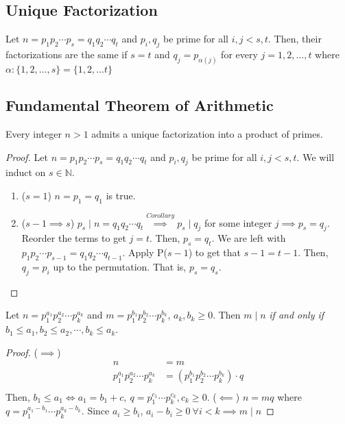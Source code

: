 \documentclass{report}
\newcommand{\N}{\mathbb{N}}
\newcommand{\proposition}[1]{\begin{tcolorbox}[title=\textit{Proposition}]{#1}\end{tcolorbox}}
\newcommand{\theorem}[1]{\begin{tcolorbox}[title=\textit{Theorem}]{#1}\end{tcolorbox}}
\begin{document}
\subsection{Unique Factorization}
Let $n = p_1 p_2 \cdots p_s = q_1 q_2 \cdots q_t$ and $p_i, q_j$ be prime for all $i, j < s, t$.
Then, their factorizations are the same if $s = t$ and $q_j = p_{\alpha(j)}$ for every 
$j = 1, 2, \ldots, t$ where $\alpha : \{1, 2, \ldots, s \} = \{ 1, 2, \ldots t \}$


\subsection{Fundamental Theorem of Arithmetic}
\theorem {
    Every integer $n > 1$ admits a unique factorization into a product of primes.
}
\begin{proof}
    Let $n = p_1 p_2 \cdots p_s = q_1 q_2 \cdots q_t$ and $p_i, q_j$ be prime for all $i, j < s, t$. We
    will induct on $s \in \N$.
    \begin{enumerate}[label=\textit{(\roman*)}]
        \item ($s = 1$)
            \newline
            $n = p_1 = q_1$ is true.
        \item ($s - 1 \implies s$)
            \newline
            $p_s \mid n = q_1 q_2 \cdots q_t \stackrel{\textit{Corollary}}{\implies} p_s \mid q_j$ 
            for some integer $j \implies p_s = q_j$. Reorder the terms to get $j = t$. Then, $p_s = q_t$. 
            We are left with $p_1 p_2 \cdots p_{s - 1} = q_1 q_2 \cdots q_{t - 1}$. Apply P($s - 1$) 
            to get that $s - 1 = t - 1$. Then, $q_j = p_i$ up to the permutation. That is, $p_s = q_s$.
    \end{enumerate}
\end{proof}


\proposition {
    Let $n = p_1^{a_1} p_2^{a_2} \cdots p_k^{a_k}$ and $m = p_1^{b_1} p_2^{b_2} \cdots p_k^{b_k}$, 
    $a_k, b_k \geq 0$.
    Then $m \mid n$ \textit{if and only if} $b_1 \leq a_1, b_2 \leq a_2, \cdots, b_k \leq a_k$.
}
\begin{proof}
    ($\implies$)
    \begin{align*}
        n &= m \\
        p_1^{a_1} p_2^{a_2} \cdots p_k^{a_k} &= \left(p_1^{b_1} p_2^{b_2} \cdots p_k^{b_k}\right) \cdot q \\
    \end{align*}
    Then, $b_1 \leq a_1 \iff a_1 = b_1 + c, \ q = p_1^{c_1} \cdots p_k^{c_k}, c_k \geq 0$.
    \newline
    \newline
    ($\impliedby$) $n = mq$ where $q = p_1^{a_1 - b_1} \cdots p_k^{a_k - b_k}$. Since $a_i \geq b_i$, 
    $a_i - b_i \geq 0 \ \forall i < k \implies m \mid n$
\end{proof}
\end{document}
